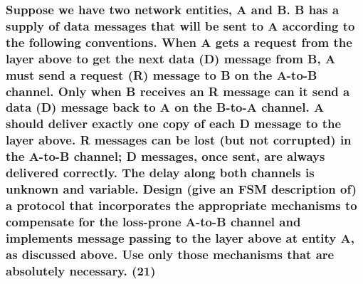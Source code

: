 \begin{center}
\end{center}




\subsubsection{Suppose we have two network entities, A and B. B has a supply of data messages that will be sent to A according to the following conventions. When A gets a request from the layer above to get the next data (D) message from B, A must send a request (R) message to B on the A-to-B channel. Only when B receives an R message can it send a data (D) message back to A on the B-to-A channel. A should deliver exactly one copy of each D message to the layer above. R messages can be lost (but not corrupted) in the A-to-B channel; D messages, once sent, are always delivered correctly. The delay along both channels is unknown and variable. Design (give an FSM description of) a protocol that incorporates the appropriate mechanisms to compensate for the loss-prone A-to-B channel and implements message passing to the layer above at entity A, as discussed above. Use only those mechanisms that are absolutely necessary. (21)}

